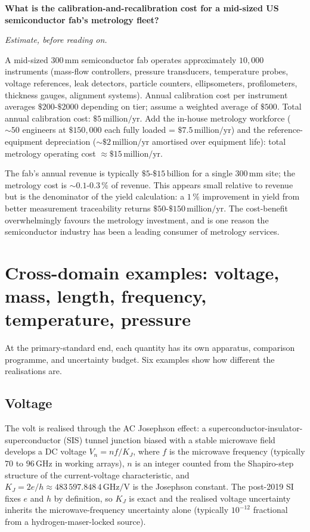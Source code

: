 \begin{estimation}
\textbf{What is the calibration-and-recalibration cost for a
mid-sized US semiconductor fab's metrology fleet?}

\smallskip
\textit{Estimate, before reading on.}

\smallskip
A mid-sized 300\,mm semiconductor fab operates approximately
$10{,}000$ instruments (mass-flow controllers, pressure
transducers, temperature probes, voltage references, leak
detectors, particle counters, ellipsometers, profilometers,
thickness gauges, alignment systems). Annual calibration cost per
instrument averages $\$200$-$\$2000$ depending on tier; assume a
weighted average of $\$500$. Total annual calibration cost: $\$5
\,\text{million}/\text{yr}$. Add the in-house metrology workforce
($\sim 50$ engineers at $\$150{,}000$ each fully loaded = $\$7.5
\,\text{million}/\text{yr}$) and the reference-equipment depreciation
($\sim \$2 \,\text{million}/\text{yr}$ amortised over equipment
life): total metrology operating cost $\approx \$15 \,\text{million}/
\text{yr}$.

The fab's annual revenue is typically $\$5$-$\$15 \,\text{billion}$
for a single 300\,mm site; the metrology cost is $\sim 0.1$-$0.3\,\%$
of revenue. This appears small relative to revenue but is the
denominator of the yield calculation: a $1\,\%$ improvement in
yield from better measurement traceability returns $\$50$-$\$150
\,\text{million}/\text{yr}$. The cost-benefit overwhelmingly favours
the metrology investment, and is one reason the semiconductor
industry has been a leading consumer of metrology services.
\end{estimation}

\section{Cross-domain examples: voltage, mass, length, frequency,
temperature, pressure}

At the primary-standard end, each quantity has its own apparatus,
comparison programme, and uncertainty budget. Six examples show how
different the realisations are.

\subsection{Voltage}

The volt is realised through the AC Josephson effect: a
superconductor-insulator-superconductor (SIS) tunnel junction
biased with a stable microwave field develops a DC voltage
$V_{n} = n f/K_{J}$, where $f$ is the microwave frequency (typically
$70$ to $96\,\si{\giga\hertz}$ in working arrays), $n$ is an
integer counted from the Shapiro-step structure of the
current-voltage characteristic, and $K_{J} = 2e/h \approx
483\,597.848\,4 \,\si{\giga\hertz\per\volt}$ is the Josephson
constant. The post-2019 SI fixes $e$ and $h$ by definition, so
$K_{J}$ is exact and the realised voltage uncertainty inherits
the microwave-frequency uncertainty alone (typically $10^{-12}$
fractional from a hydrogen-maser-locked source).

